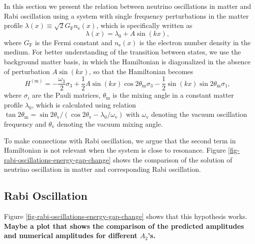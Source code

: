 \documentclass[%
preprint,
 amsmath,amssymb,
 aps,
]{revtex4-1}
\begin{document}
In this section we present the relation between neutrino oscillations in matter and Rabi oscillation using a system with single frequency perturbations in the matter profile $\lambda(x)\equiv\sqrt{2}G_{\mathrm F} n_{\mathrm e}(x)$, which is specifically written as
\begin{equation}
    \lambda(x) = \lambda_0 + A \sin (k x) ,
\end{equation}
where $G_{\mathrm F}$ is the Fermi constant and $n_{\mathrm e}(x)$ is the electron number density in the medium. For better understanding of the transition between states, we use the background matter basis, in which the Hamiltonian is diagonalized in the absence of perturbation $A\sin(kx)$, so that the Hamiltonian becomes
\begin{equation}
    H^{(\mathrm{m})} = -\frac{\omega_3}{2} \sigma_3 + \frac{1}{2} A\sin (kx) \cos 2\theta_{\mathrm m} \sigma_3 -\frac{1}{2} \sin(kx) \sin 2\theta_{\mathrm m} \sigma_1,
\end{equation}
where $\sigma_i$ are the Pauli matrices, $\theta_{\mathrm m}$ is the mixing angle in a constant matter profile $\lambda_0$, which is calculated using relation $\tan 2\theta_{\mathrm{m}}=\sin 2\theta_{\mathrm v}/\left( \cos 2\theta_{\mathrm v} - \lambda_0/\omega_{\mathrm v} \right)$ with $\omega_{\mathrm v}$ denoting the vacuum oscillation frequency and $\theta_{\mathrm v}$ denoting the vacuum mixing angle.

To make connections with Rabi oscillation, we argue that the second term in Hamiltonian is not relevant when the system is close to resonance. Figure \ref{fig-rabi-oscillations-energy-gap-change} shows the comparison of the solution of neutrino oscillation in matter and corresponding Rabi oscillation.





\subsection{Rabi Oscillation}





Figure \ref{fig-rabi-oscillations-energy-gap-change} shows that this hypothesis works. {\bf Maybe a plot that shows the comparison of the predicted amplitudes and numerical amplitudes for different $A_2$'s.}
\end{document}
